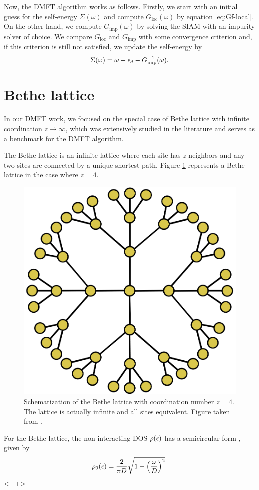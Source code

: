 \documentclass[12pt]{report}
\begin{document}
Now, the DMFT algorithm works as follows. Firstly, we start with an initial guess for the self-energy $\Sigma(\omega)$ and compute $G_{\text{loc}}(\omega)$ by equation \ref{eq:Gf-local}. On the other hand, we compute $G_{\text{imp}}(\omega)$ by solving the SIAM with an impurity solver of choice. We compare $G_{\text{loc}}$ and $G_{\text{imp}}$ with some convergence criterion and, if this criterion is still not satisfied, we update the self-energy by
\begin{equation} \label{eq:self-energy-update}
\Sigma(\omega) = \omega - \epsilon_d - G_{\text{imp}}^{-1}(\omega).
\end{equation}

\section{Bethe lattice} \label{sec:bethe}

In our DMFT work, we focused on the special case of Bethe lattice with infinite coordination $z\to\infty$, which was extensively studied in the literature \cite{georges1996, thesis_dmft_graz} and serves as a benchmark for the DMFT algorithm.

The Bethe lattice is an infinite lattice where each site has $z$ neighbors and any two sites are connected by a unique shortest path. Figure \ref{fig:bethe-lattice} represents a Bethe lattice in the case where $z = 4$.
\begin{figure}[H]
\centering
\includegraphics[width=0.4\linewidth]{fig/bethe-lattice.png}
\caption{Schematization of the Bethe lattice with coordination number $z = 4$. The lattice is actually infinite and all sites equivalent. Figure taken from \cite{thesis_dmft_graz}.}
\label{fig:bethe-lattice}
\end{figure}

For the Bethe lattice, the non-interacting DOS $\rho(\epsilon)$ has a semicircular form \cite{georges1996}, given by
$$
\rho_0(\epsilon) = \frac{2}{\pi D} \sqrt{1-\qty(\frac{\omega}{D})^2}.
$$
<++>
\end{document}
